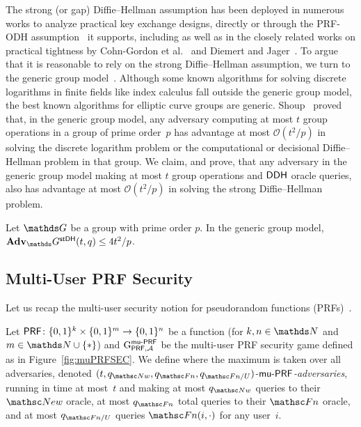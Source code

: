 The strong (or gap) Diffie--Hellman assumption has been deployed in numerous works to analyze practical key exchange designs, directly or through the PRF-ODH assumption~\cite{C:JKSS12,C:BFGJ17} it supports, including \cite{C:JKSS12,CCS:FisGue14,CCS:DFGS15,EuroSP:KraWee16,EPRINT:DFGS16,EuroSP:FisGue17,JC:DFGS21} as well as in the closely related works on practical tightness by Cohn-Gordon et al.~\cite{C:CCGJJ19} and Diemert and Jager~\cite{JC:DieJag20}.
To argue that it is reasonable to rely on the strong Diffie--Hellman assumption, we turn to the generic group model~\cite{EC:Shoup97,IMA:Maurer05}.
Although some known algorithms for solving discrete logarithms in finite fields like index calculus fall outside the generic group model, the best known algorithms for elliptic curve groups are generic.
Shoup~\cite{EC:Shoup97} proved that, in the generic group model, any adversary computing at most $t$ group operations in a group of prime order~$p$ has advantage at most $\mathcal{O}(t^2/p)$ in solving the discrete logarithm problem or the computational or decisional Diffie--Hellman problem in that group.
We claim, and prove, that any adversary in the generic group model making at most $t$ group operations and $\mathsf{DDH}$ oracle queries, also has advantage at most $\mathcal{O}(t^2/p)$ in solving the strong Diffie--Hellman problem.

\begin{theorem}
	\label{thm-ggm-bound}
	Let $\group$ be a group with prime order $p$.
	In the generic group model,
	$\Adv_\group^{\strongDH}(t,q) \leq 4t^2 / p$.
\end{theorem}
\fi

\iffull
\subsection{Multi-User PRF Security}
\label{sec:components:muPRF}

Let us recap the multi-user security notion for pseudorandom functions (PRFs)~\cite{FOCS:BelCanKra96}.
\else
\label{apx:components:muPRF}
\fi

\begin{definition}
	\label{def:muPRFSEC}
	Let $\mathsf{PRF} \colon \{0,1\}^k \times \{0,1\}^m \to \{0,1\}^n$ be a function (for $k, n \in \NN$ and $m \in \NN \cup \{*\}$)
	and $\textnormal{G}^{\mathsf{mu{\text{\normalfont-}}PRF}}_{\mathsf{PRF},\mathcal{A}}$ be the multi-user PRF security game defined as in Figure~\ref{fig:muPRFSEC}.
	We define
	where the maximum is taken over all adversaries, denoted \emph{$(t, \qNew, \qPRFfn,\qPRFfnU)$-$\mathsf{mu{\text{\normalfont-}}PRF}$-adversaries}, running in time at most~$t$ and making at most $\qNew$ queries to their $\New$ oracle, at most $\qPRFfn$ total queries to their $\PRFfn$ oracle, and at most $\qPRFfnU$ queries $\PRFfn(i, \cdot)$ for any user~$i$.
\end{definition}

